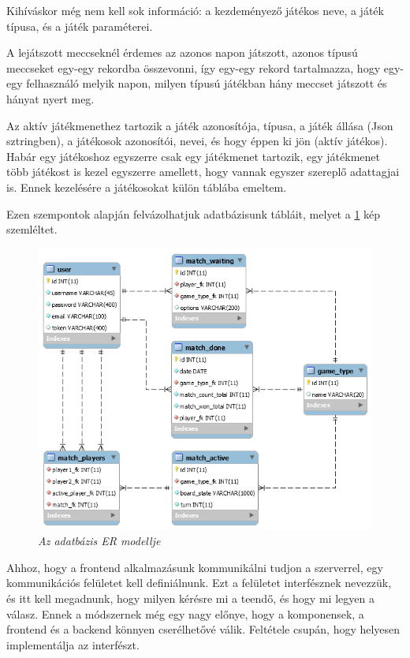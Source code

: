 Kihíváskor még nem kell sok információ: a kezdeményező játékos neve, a játék típusa, és a játék paraméterei.

A lejátszott meccseknél érdemes az azonos napon játszott, azonos típusú meccseket egy-egy rekordba összevonni, így egy-egy rekord tartalmazza, hogy egy-egy felhasználó melyik napon, milyen típusú játékban hány meccset játszott és hányat nyert meg.

Az aktív játékmenethez tartozik a játék azonosítója, típusa, a játék állása (Json sztringben), a játékosok azonosítói, nevei, és hogy éppen ki jön (aktív játékos). Habár egy játékoshoz egyszerre csak egy játékmenet tartozik, egy játékmenet több játékost is kezel egyszerre amellett, hogy vannak egyszer szereplő adattagjai is. Ennek kezelésére a játékosokat külön táblába emeltem.

Ezen szempontok alapján felvázolhatjuk adatbázisunk tábláit, melyet a \ref{fig:er-model} kép szemléltet.

\begin{figure}[!h]
	\centering
	\includegraphics[width=0.9\linewidth]{kepek/online-games-er.png}
	\caption{\textit{Az adatbázis ER modellje}}
	\label{fig:er-model}
\end{figure}




Ahhoz, hogy a frontend alkalmazásunk kommunikálni tudjon a szerverrel, egy kommunikációs felületet kell definiálnunk. Ezt a felületet interfésznek nevezzük, és itt kell megadnunk, hogy milyen kérésre mi a teendő, és hogy mi legyen a válasz. Ennek a módszernek még egy nagy előnye, hogy a komponensek, a frontend és a backend könnyen cserélhetővé válik. Feltétele csupán, hogy helyesen implementálja az interfészt.

